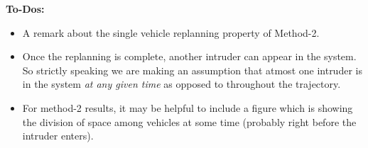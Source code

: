 
\textbf{To-Dos:}
\begin{itemize}
\item A remark about the single vehicle replanning property of Method-2.
\item Once the replanning is complete, another intruder can appear in the system. So strictly speaking we are making an assumption that atmost one intruder is in the system \textit{at any given time} as opposed to throughout the trajectory.
\item For method-2 results, it may be helpful to include a figure which is showing the division of space among vehicles at some time (probably right before the intruder enters). 
\end{itemize}
